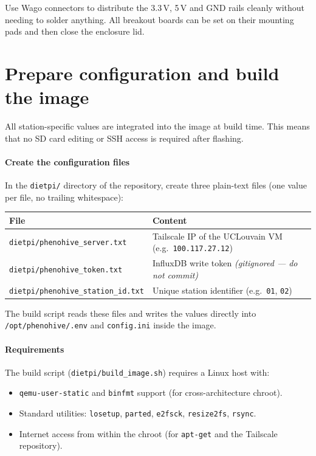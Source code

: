 Use Wago connectors to distribute the 3.3\,V, 5\,V and GND rails cleanly without needing to solder anything. All breakout boards can be set on their mounting pads and then close the enclosure lid.

\section{Prepare configuration and build the image}

All station-specific values are integrated into the image at build time. This means that no SD card editing or SSH access is required after flashing.

\paragraph{Create the configuration files} In the \texttt{dietpi/} directory of the repository, create three plain-text files (one value per file, no trailing whitespace):

\begin{center}
\begin{tabular}{|l|l|}
\hline
\textbf{File} & \textbf{Content} \\
\hline
\texttt{dietpi/phenohive\_server.txt} & Tailscale IP of the UCLouvain VM (e.g.\ \texttt{100.117.27.12}) \\
\texttt{dietpi/phenohive\_token.txt} & InfluxDB write token \emph{(gitignored --- do not commit)} \\
\texttt{dietpi/phenohive\_station\_id.txt} & Unique station identifier (e.g.\ \texttt{01}, \texttt{02}) \\
\hline
\end{tabular}
\end{center}

The build script reads these files and writes the values directly into \texttt{/opt/phenohive/.env} and \texttt{config.ini} inside the image.

\paragraph{Requirements} The build script (\texttt{dietpi/build\_image.sh}) requires a Linux host with:
\begin{itemize}
    \item \texttt{qemu-user-static} and \texttt{binfmt} support (for cross-architecture chroot).
    \item Standard utilities: \texttt{losetup}, \texttt{parted}, \texttt{e2fsck}, \texttt{resize2fs}, \texttt{rsync}.
    \item Internet access from within the chroot (for \texttt{apt-get} and the Tailscale repository).
\end{itemize}

